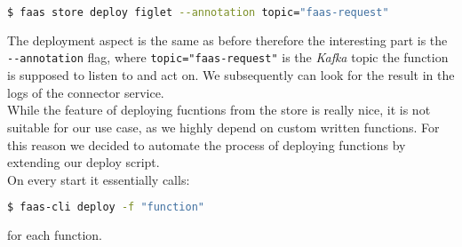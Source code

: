 \begin{lstlisting}[language=bash]
  $ faas store deploy figlet --annotation topic="faas-request"
\end{lstlisting}

The deployment aspect is the same as before therefore the interesting part is the \texttt{-{}-annotation} flag, where \texttt{topic="faas-request"} is the \textit{Kafka} topic the function is supposed to listen to and act on. We subsequently can look for the result in the logs of the connector service. \\
While the feature of deploying fucntions from the store is really nice, it is not suitable for our use case, as we highly depend on custom written functions. For this reason we decided to automate the process of deploying functions by extending our deploy script. \\

On every start it essentially calls:

\begin{lstlisting}[language=bash]
  $ faas-cli deploy -f "function"
\end{lstlisting}

for each function.
